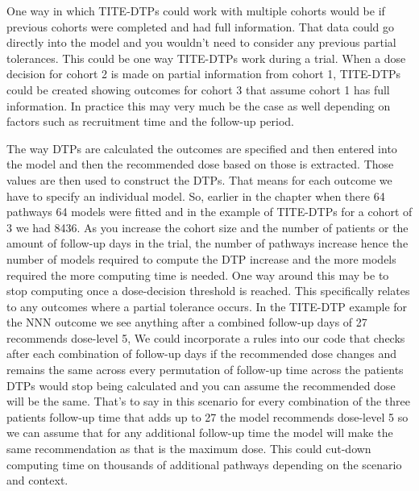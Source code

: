 One way in which TITE-DTPs could work with multiple cohorts would be if previous cohorts were completed and had full information. That data could go directly into the model and you wouldn't need to consider any previous partial tolerances. This could be one way TITE-DTPs work during a trial. When a dose decision for cohort 2 is made on partial information from cohort 1, TITE-DTPs could be created showing outcomes for cohort 3 that assume cohort 1 has full information. In practice this may very much be the case as well depending on factors such as recruitment time and the follow-up period. 

The way DTPs are calculated the outcomes are specified and then entered into the model and then the recommended dose based on those is extracted. Those values are then used to construct the DTPs. That means for each outcome we have to specify an individual model. So, earlier in the chapter when there 64 pathways 64 models were fitted and in the example of TITE-DTPs for a cohort of 3 we had 8436. As you increase the cohort size and the number of patients or the amount of follow-up days in the trial, the number of pathways increase hence the number of models required to compute the DTP increase and the more models required the more computing time is needed. One way around this may be to stop computing once a dose-decision threshold is reached. This specifically relates to any outcomes where a partial tolerance occurs.  In the TITE-DTP example for the NNN outcome we see anything after a combined follow-up days of 27 recommends dose-level 5, We could incorporate a rules into our code that checks after each combination of follow-up days if the recommended dose changes and remains the same across every permutation of follow-up time across the patients DTPs would stop being calculated and you can assume the recommended dose will be the same. That's to say in this scenario for every combination of the three patients follow-up time that adds up to 27 the model recommends dose-level 5 so we can assume that for any additional follow-up time the model will make the same recommendation as that is the maximum dose. This could cut-down computing time on thousands of additional pathways depending on the scenario and context. 

